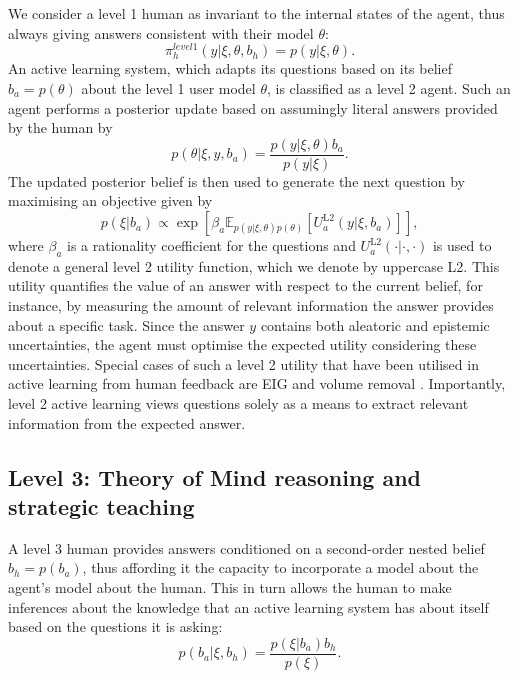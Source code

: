 \documentclass[letterpaper]{article} %
\begin{document}
We consider a level 1 human as invariant to the internal states of the agent, thus always giving answers consistent with their model $\theta$:
\begin{equation}
    \pi^{level 1}_h(y | \xi, \theta, b_h) = p(y | \xi, \theta).
\end{equation}
An active learning system, which adapts its questions based on its belief $b_a = p(\theta)$ about the level 1 user model $\theta$, is classified as a level 2 agent. Such an agent performs a posterior update based on assumingly literal answers provided by the human by
\begin{equation}
    p(\theta | \xi, y, b_a) = \frac{p(y | \xi, \theta)b_a}{p(y|\xi)}.
\end{equation}
The updated posterior belief is then used to generate the next question by maximising an objective given by
\begin{equation}
    p(\xi|b_a) \propto \exp \left[ \beta_a \mathbb{E}_{p(y|\xi,\theta)p(\theta)}\left[U^{\text{L2}}_a(y | \xi, b_a)\right] \right],
    \label{eq:level2_objective}
\end{equation}
where $\beta_a$ is a rationality coefficient for the questions and $U^{\text{L2}}_a(\cdot|\cdot, \cdot)$ is used to denote a general level 2 utility function, which we denote by uppercase L2. This utility quantifies the value of an answer with respect to the current belief, for instance, by measuring the amount of relevant information the answer provides about a specific task. Since the answer $y$ contains both aleatoric and epistemic uncertainties, the agent must optimise the expected utility considering these uncertainties. Special cases of such a level 2 utility that have been utilised in active learning from human feedback are EIG \cite{biyik2023ActivePreferenceGP} and volume removal \cite{Basu2018learning}. Importantly, level 2 active learning views questions solely  as a means to extract relevant information from the expected answer.

\subsection{Level 3: Theory of Mind reasoning and strategic teaching}

A level 3 human provides answers conditioned on a second-order nested belief $b_h = p(b_a)$, thus affording it the capacity to incorporate a model about the agent's model about the human. This in turn allows the human to make inferences about the knowledge that an active learning system has about itself based on the questions it is asking:
\begin{equation}
    p(b_a | \xi, b_h) = \frac{p(\xi | b_a)b_h}{p(\xi)}.
    \label{eq:level3tom}
\end{equation}
\end{document}
